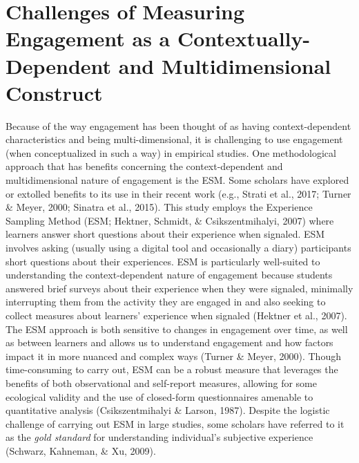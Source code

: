 \documentclass[]{msu-thesis}
\theoremstyle{definition}
\theoremstyle{definition}
\theoremstyle{definition}
\theoremstyle{remark}
\begin{document}
\section{Challenges of Measuring Engagement as a Contextually-Dependent
and Multidimensional
Construct}\label{challenges-of-measuring-engagement-as-a-contextually-dependent-and-multidimensional-construct}

Because of the way engagement has been thought of as having
context-dependent characteristics and being multi-dimensional, it is
challenging to use engagement (when conceptualized in such a way) in
empirical studies. One methodological approach that has benefits
concerning the context-dependent and multidimensional nature of
engagement is the ESM. Some scholars have explored or extolled benefits
to its use in their recent work (e.g., Strati et al., 2017; Turner \&
Meyer, 2000; Sinatra et al., 2015). This study employs the Experience
Sampling Method (ESM; Hektner, Schmidt, \& Csikszentmihalyi, 2007) where
learners answer short questions about their experience when signaled.
ESM involves asking (usually using a digital tool and occasionally a
diary) participants short questions about their experiences. ESM is
particularly well-suited to understanding the context-dependent nature
of engagement because students answered brief surveys about their
experience when they were signaled, minimally interrupting them from the
activity they are engaged in and also seeking to collect measures about
learners' experience when signaled (Hektner et al., 2007). The ESM
approach is both sensitive to changes in engagement over time, as well
as between learners and allows us to understand engagement and how
factors impact it in more nuanced and complex ways (Turner \& Meyer,
2000). Though time-consuming to carry out, ESM can be a robust measure
that leverages the benefits of both observational and self-report
measures, allowing for some ecological validity and the use of
closed-form questionnaires amenable to quantitative analysis
(Csikszentmihalyi \& Larson, 1987). Despite the logistic challenge of
carrying out ESM in large studies, some scholars have referred to it as
the \emph{gold standard} for understanding individual's subjective
experience (Schwarz, Kahneman, \& Xu, 2009).
\end{document}

